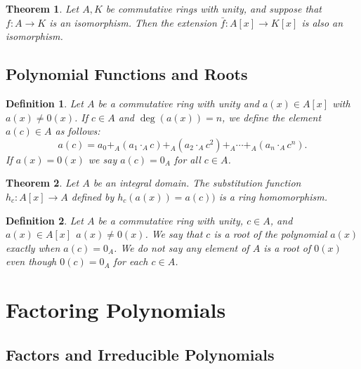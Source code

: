 \documentclass[letterpaper, 12pt]{article}
\newtheorem{defn}{Definition}
\newtheorem{thm}{Theorem}
\begin{document}
			\setcounter{thm}{29}
			\begin{thm}
			Let $A, K$ be commutative rings with unity, and suppose that $f:A \to K$ is an isomorphism.
			Then the extension $\bar{f} : A[x] \to K[x]$ is also an isomorphism.
			\end{thm}

		\subsection{Polynomial Functions and Roots}
		\label{sub:polynomial_functions_and_roots}
			\setcounter{defn}{32}
			\begin{defn}
			Let $A$ be a commutative ring with unity and $a(x) \in A[x]$ with $a(x) \neq 0(x)$. 
			If $c \in A$ and $\deg(a(x)) = n$, we define the element $a(c) \in A$ as follows: $$a(c) = a_{0} +_{A} (a_{1} \cdot_{A} c) +_{A} (a_{2} \cdot_{A} c^{2}) +_{A} \cdots +_{A} (a_{n} \cdot_{A} c^{n}).$$
			If $a(x) = 0(x)$ we say $a(c) = 0_{A}$ for all $c \in A$.
			\end{defn}

			\setcounter{thm}{34}
			\begin{thm}
			Let $A$ be an integral domain. 
			The substitution function $h_{c}: A[x] \to A$ defined by $h_{c}(a(x)) = a(c))$ is a ring homomorphism.
			\end{thm}

			\setcounter{defn}{36}
			\begin{defn}
			Let $A$ be a commutative ring with unity, $c \in A$, and $a(x) \in A[x] \ \ a(x) \neq 0(x)$.
			We say that $c$ is a root of the polynomial $a(x)$ exactly when $a(c) = 0_{A}$. 
			We do not say any element of $A$ is a root of $0(x)$ even though $0(c) = 0_{A}$ for each $c \in A$.
			\end{defn}

	\section{Factoring Polynomials}
	\label{sec:factoring_polynomials}
		\subsection{Factors and Irreducible Polynomials}
		\label{sec:factors_and_irreducible_polynomials}
			\setcounter{defn}{0}
			\setcounter{thm}{0}
\end{document}
